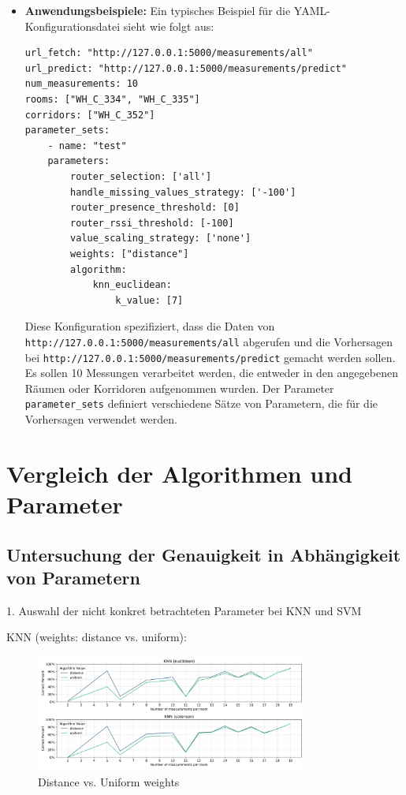 \begin{itemize}
    \item \textbf{Anwendungsbeispiele:} Ein typisches Beispiel für die YAML-Konfigurationsdatei sieht wie folgt aus:
          \begin{lstlisting}[caption=.yaml Konfigurationsdatei, label={lst:code_yaml}]
url_fetch: "http://127.0.0.1:5000/measurements/all"
url_predict: "http://127.0.0.1:5000/measurements/predict"
num_measurements: 10
rooms: ["WH_C_334", "WH_C_335"]
corridors: ["WH_C_352"]
parameter_sets:
    - name: "test"
    parameters:
        router_selection: ['all']
        handle_missing_values_strategy: ['-100']
        router_presence_threshold: [0]
        router_rssi_threshold: [-100]
        value_scaling_strategy: ['none']
        weights: ["distance"]
        algorithm:
            knn_euclidean:
                k_value: [7]
        \end{lstlisting}
          Diese Konfiguration spezifiziert, dass die Daten von \texttt{http://127.0.0.1:5000/\discretionary{}{}{}measure\discretionary{}{}{}ments/\discretionary{}{}{}all} abgerufen und die Vorhersagen bei \texttt{http://127.0.0.1:5000/\discretionary{}{}{}measure\discretionary{}{}{}ments/\discretionary{}{}{}predict} gemacht werden sollen. Es sollen 10 Messungen verarbeitet werden, die entweder in den angegebenen Räumen oder Korridoren aufgenommen wurden. Der Parameter \texttt{parameter\_sets} definiert verschiedene Sätze von Parametern, die für die Vorhersagen verwendet werden.
\end{itemize}



\section{Vergleich der Algorithmen und Parameter}
\subsection{Untersuchung der Genauigkeit in Abhängigkeit von Parametern}

1. Auswahl der nicht konkret betrachteten Parameter bei KNN und SVM

KNN (weights: distance vs. uniform):

\begin{figure}[H]
    \centering
    \includegraphics[width=0.8\textwidth]{images/1_distance_uniform_weights_01.png}
    \caption{Distance vs. Uniform weights}
    \label{fig:1_distance_uniform_weights_01}
\end{figure}

